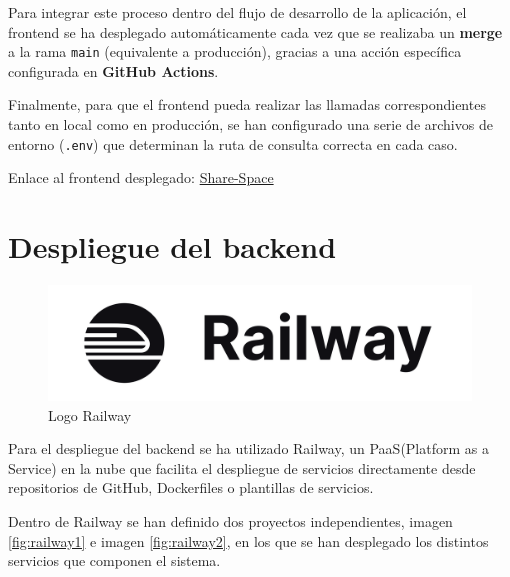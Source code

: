 Para integrar este proceso dentro del flujo de desarrollo de la aplicación, el frontend se ha desplegado automáticamente cada vez que se realizaba un \textbf{merge} a la rama \texttt{main} (equivalente a producción), gracias a una acción específica configurada en \textbf{GitHub Actions}. 

Finalmente, para que el frontend pueda realizar las llamadas correspondientes tanto en local como en producción, se han configurado una serie de archivos de entorno (\texttt{.env}) que determinan la ruta de consulta correcta en cada caso.

\vspace{0.25em}
Enlace al frontend desplegado: \href{https://alonsodm12.github.io/TFG_COHOUSING/}{Share-Space}


\section{Despliegue del backend}

\begin{figure}[H]
  \centering
  \includegraphics[width=1\textwidth]{fotos/railway.png}
  \caption{Logo Railway}
  \label{fig:railway}
\end{figure}
Para el despliegue del backend se ha utilizado Railway, un PaaS(Platform as a Service) en la nube que facilita el despliegue de servicios directamente desde repositorios de GitHub, Dockerfiles o plantillas de servicios.

Dentro de Railway se han definido dos proyectos independientes, imagen \ref{fig:railway1} e imagen \ref{fig:railway2}, en los que se han desplegado los distintos servicios que componen el sistema.

